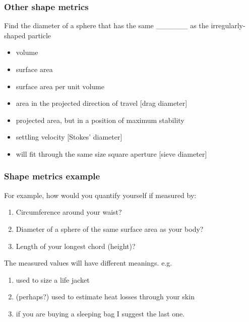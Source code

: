 \begin{frame}\frametitle{Other shape metrics}
	Find the diameter of a sphere that has the same \_\_\_\_\_\_ as the irregularly-shaped particle
	\begin{itemize}
		\item	volume
		\item	surface area
		\item	surface area per unit volume
		\item	area in the projected direction of travel [drag diameter]
		\item	projected area, but in a position of maximum stability
		\item	settling velocity [Stokes' diameter]
		\item	will fit through the same size square aperture  [sieve diameter]
	\end{itemize}
\end{frame}

\begin{frame}\frametitle{Shape metrics example}
	
	For example, how would you quantify yourself if measured by:
	\begin{enumerate}
		\item	Circumference around your waist?
		\item	Diameter of a sphere of the same surface area as your body?
		\item	Length of your longest chord (height)?
		
	\end{enumerate}
	
	\vspace{12pt}
	The measured values will have different meanings. e.g.
	\begin{enumerate}
		\item	used to size a life jacket 
		\item	(perhaps?) used to estimate heat losses through your skin
		\item	if you are buying a sleeping bag I suggest the last one.
	\end{enumerate}
	
\end{frame}

